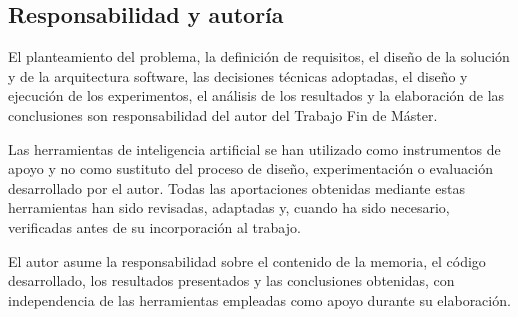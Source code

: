 \subsection*{Responsabilidad y autoría}

El planteamiento del problema, la definición de requisitos, el diseño de la solución y de la
arquitectura software, las decisiones técnicas adoptadas, el diseño y ejecución de los experimentos,
el análisis de los resultados y la elaboración de las conclusiones son responsabilidad del autor del
Trabajo Fin de Máster.

Las herramientas de inteligencia artificial se han utilizado como instrumentos de apoyo y no como
sustituto del proceso de diseño, experimentación o evaluación desarrollado por el autor. Todas las
aportaciones obtenidas mediante estas herramientas han sido revisadas, adaptadas y, cuando ha sido
necesario, verificadas antes de su incorporación al trabajo.

El autor asume la responsabilidad sobre el contenido de la memoria, el código desarrollado, los
resultados presentados y las conclusiones obtenidas, con independencia de las herramientas empleadas
como apoyo durante su elaboración.
